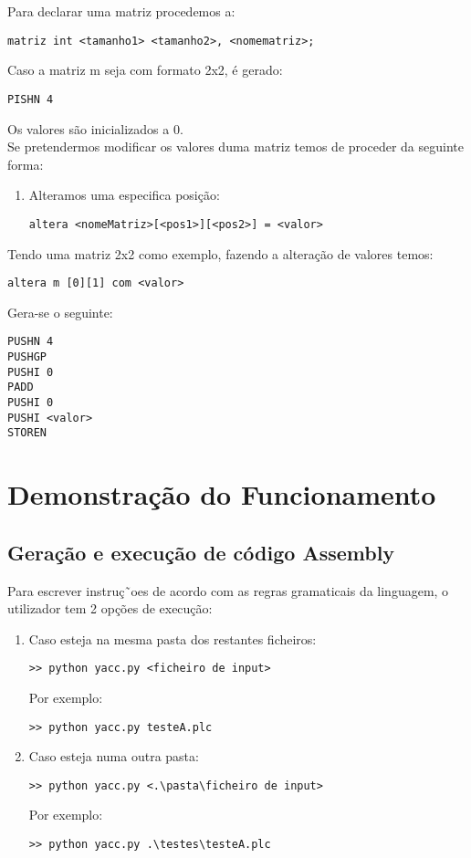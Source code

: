 \documentclass[11pt,a4paper]{report}
\begin{document}
Para declarar uma matriz procedemos a: 
\begin{lstlisting}
matriz int <tamanho1> <tamanho2>, <nomematriz>;   
\end{lstlisting}
Caso a matriz m seja com formato 2x2, é gerado:
\begin{lstlisting}
PISHN 4
\end{lstlisting}
Os valores são inicializados a 0. \\

Se pretendermos modificar os valores duma matriz temos de proceder da seguinte forma:
\begin{enumerate}
\item Alteramos uma especifica posição:
\begin{lstlisting}
altera <nomeMatriz>[<pos1>][<pos2>] = <valor>    
\end{lstlisting}
\end{enumerate}

Tendo uma matriz 2x2 como exemplo, fazendo a alteração de valores temos:
\begin{lstlisting}
altera m [0][1] com <valor>
\end{lstlisting}
Gera-se o seguinte:
\begin{lstlisting}
PUSHN 4
PUSHGP
PUSHI 0
PADD
PUSHI 0
PUSHI <valor>
STOREN
\end{lstlisting}

\chapter{Demonstração do Funcionamento}
\section{Geração e  execução de código Assembly}
Para escrever instruç˜oes de acordo com as regras gramaticais da linguagem, o utilizador tem 2 opções de execução:
\begin{enumerate}
\item Caso esteja na mesma pasta dos restantes ficheiros:
\begin{verbatim} 
>> python yacc.py <ficheiro de input> 
\end{verbatim}
Por exemplo:
\begin{verbatim} 
>> python yacc.py testeA.plc
\end{verbatim} 
\item Caso esteja numa outra pasta:
\begin{verbatim} 
>> python yacc.py <.\pasta\ficheiro de input>
\end{verbatim} 

Por exemplo:
\begin{verbatim} 
>> python yacc.py .\testes\testeA.plc
\end{verbatim} 
\end{enumerate}
\end{document}
